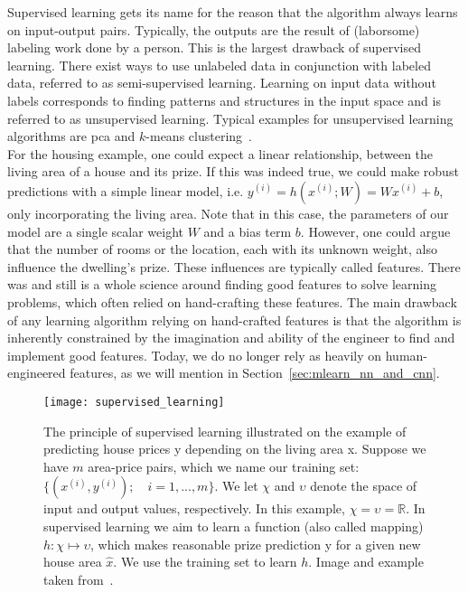 Supervised learning gets its name for the reason that the algorithm always learns on input-output pairs. Typically, the outputs  are the result of (laborsome) labeling work done by a person. This is the largest drawback of supervised learning. There exist ways to use unlabeled data in conjunction with labeled data, referred to as semi-supervised learning. Learning on input data without labels corresponds to finding patterns and structures in the input space and is referred to as unsupervised learning. Typical examples for unsupervised learning algorithms are \gls{pca} and $k$-means clustering~\cite{Goodfellow2016DeepLearning}.\\
For the housing example, one could expect a linear relationship, between the living area of a house and its prize. If this was indeed true, we could make robust predictions with a simple linear model, i.e. $y^{(i)} = h(x^{(i)}; W) = Wx^{(i)} + b$, only incorporating the living area. Note that in this case, the parameters of our model are a single scalar weight $W$ and a bias term $b$.
However, one could argue that the number of rooms or the location, each with its unknown weight, also influence the dwelling's prize. These influences are typically called features. There was and still is a whole science around finding good features to solve learning problems, which often relied on hand-crafting these features. The main drawback of any learning algorithm relying on hand-crafted features is that the algorithm is inherently constrained by the imagination and ability of the engineer to find and implement good features. Today, we do no longer rely as heavily on human-engineered features, as we will mention in Section~\ref{sec:mlearn_nn_and_cnn}.

\begin{figure}[htbp]
    \centering
	\texttt{[image: supervised\_learning]}
    \caption[Supervised Learning]{The principle of supervised learning illustrated on the example of predicting house prices y depending on the living area x. Suppose we have $m$ area-price pairs, which we name our training set: $\{(x^{(i)}, y^{(i)}); \quad i = 1,...,m\}$. We let $\chi$ and $\upsilon$ denote the space of input and output values, respectively. In this example, $\chi = \upsilon = \mathbb{R}$. In supervised learning we aim to learn a function (also called mapping) $h : \chi \mapsto \upsilon$, which makes reasonable prize prediction y for a given new house area $\hat{x}$. We use the training set to learn $h$. Image and example taken from~\cite{Ng2012StanfordNotes}.}
    \label{fig:dl_supervised}
\end{figure}

